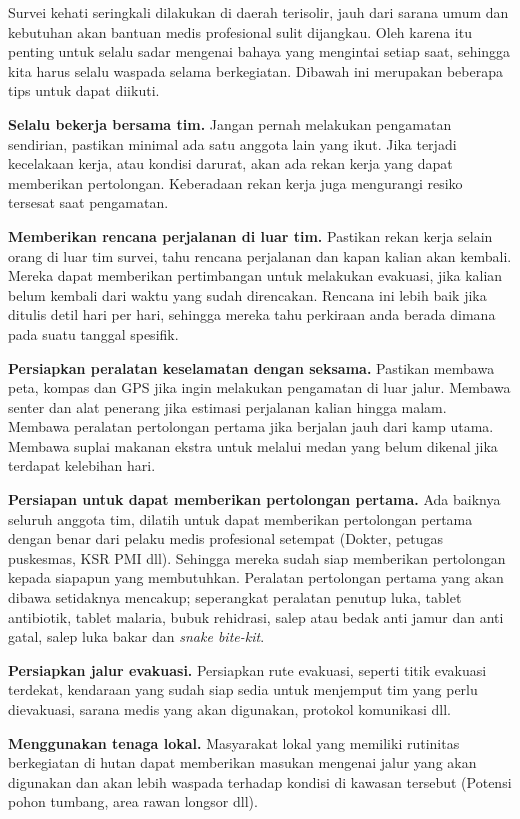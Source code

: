 \documentclass[
]{book}
\begin{document}
Survei kehati seringkali dilakukan di daerah terisolir, jauh dari sarana umum dan kebutuhan akan bantuan medis profesional sulit dijangkau. Oleh karena itu penting untuk selalu sadar mengenai bahaya yang mengintai setiap saat, sehingga kita harus selalu waspada selama berkegiatan. Dibawah ini merupakan beberapa tips untuk dapat diikuti.

\textbf{Selalu bekerja bersama tim.} Jangan pernah melakukan pengamatan sendirian, pastikan minimal ada satu anggota lain yang ikut. Jika terjadi kecelakaan kerja, atau kondisi darurat, akan ada rekan kerja yang dapat memberikan pertolongan. Keberadaan rekan kerja juga mengurangi resiko tersesat saat pengamatan.

\textbf{Memberikan rencana perjalanan di luar tim.} Pastikan rekan kerja selain orang di luar tim survei, tahu rencana perjalanan dan kapan kalian akan kembali. Mereka dapat memberikan pertimbangan untuk melakukan evakuasi, jika kalian belum kembali dari waktu yang sudah direncakan. Rencana ini lebih baik jika ditulis detil hari per hari, sehingga mereka tahu perkiraan anda berada dimana pada suatu tanggal spesifik.

\textbf{Persiapkan peralatan keselamatan dengan seksama.} Pastikan membawa peta, kompas dan GPS jika ingin melakukan pengamatan di luar jalur. Membawa senter dan alat penerang jika estimasi perjalanan kalian hingga malam. Membawa peralatan pertolongan pertama jika berjalan jauh dari kamp utama. Membawa suplai makanan ekstra untuk melalui medan yang belum dikenal jika terdapat kelebihan hari.

\textbf{Persiapan untuk dapat memberikan pertolongan pertama.} Ada baiknya seluruh anggota tim, dilatih untuk dapat memberikan pertolongan pertama dengan benar dari pelaku medis profesional setempat (Dokter, petugas puskesmas, KSR PMI dll). Sehingga mereka sudah siap memberikan pertolongan kepada siapapun yang membutuhkan. Peralatan pertolongan pertama yang akan dibawa setidaknya mencakup; seperangkat peralatan penutup luka, tablet antibiotik, tablet malaria, bubuk rehidrasi, salep atau bedak anti jamur dan anti gatal, salep luka bakar dan \emph{snake bite-kit}.

\textbf{Persiapkan jalur evakuasi.} Persiapkan rute evakuasi, seperti titik evakuasi terdekat, kendaraan yang sudah siap sedia untuk menjemput tim yang perlu dievakuasi, sarana medis yang akan digunakan, protokol komunikasi dll.

\textbf{Menggunakan tenaga lokal.} Masyarakat lokal yang memiliki rutinitas berkegiatan di hutan dapat memberikan masukan mengenai jalur yang akan digunakan dan akan lebih waspada terhadap kondisi di kawasan tersebut (Potensi pohon tumbang, area rawan longsor dll).
\end{document}

